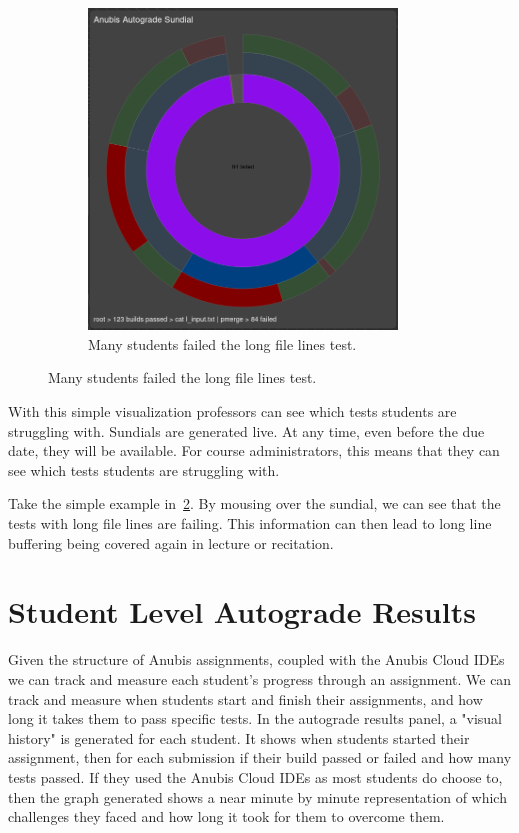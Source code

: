 \begin{figure}[ht]
\begin{subfigure}{0.5\textwidth}
        \includegraphics[width=0.9\textwidth]{figures/sundial-3}
        \caption{Many students failed the long file lines test.\label{fig:autograde-sundial-3} }
    \end{subfigure}
\end{figure}

With this simple visualization professors can see which tests students are struggling with.
Sundials are generated live.
At any time, even before the due date, they will be available.
For course administrators, this means that they can see which tests students are struggling with.


Take the simple example in~\ref{fig:autograde-sundial-3}.
By mousing over the sundial, we can see that the tests with long file lines are failing.
This information can then lead to long line buffering being covered again in lecture or
recitation.

\section{Student Level Autograde Results}\label{sec:student-level-results}

Given the structure of Anubis assignments, coupled with the Anubis Cloud IDEs we can
track and measure each student's progress through an assignment.
We can track and measure when students start and finish their assignments,
and how long it takes them to pass specific tests.
In the autograde results panel, a "visual history" is generated for each student.
It shows when students started their assignment, then for each submission if their
build passed or failed and how many tests passed.
If they used the Anubis Cloud IDEs as most students do choose to,
then the graph generated shows a near minute by minute representation of which
challenges they faced and how long it took for them to overcome them.

